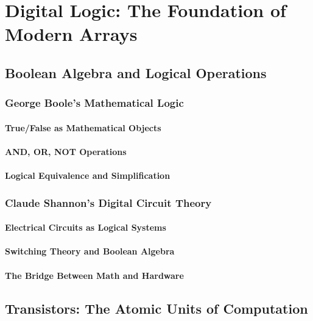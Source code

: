 \documentclass[12pt, oneside]{book}
\begin{document}

\chapter{Digital Logic: The Foundation of Modern Arrays}

\section{Boolean Algebra and Logical Operations}
\subsection{George Boole's Mathematical Logic}
\subsubsection{True/False as Mathematical Objects}
\subsubsection{AND, OR, NOT Operations}
\subsubsection{Logical Equivalence and Simplification}

\subsection{Claude Shannon's Digital Circuit Theory}
\subsubsection{Electrical Circuits as Logical Systems}
\subsubsection{Switching Theory and Boolean Algebra}
\subsubsection{The Bridge Between Math and Hardware}

\section{Transistors: The Atomic Units of Computation}
\end{document}
